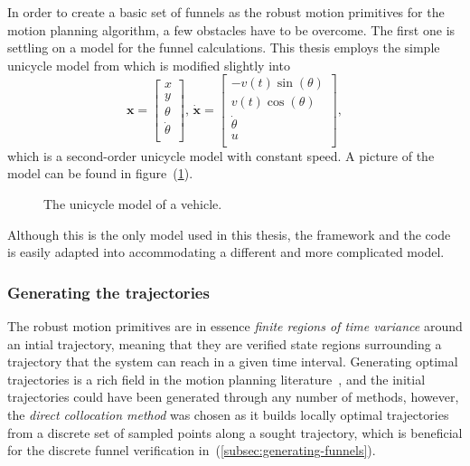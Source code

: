 In order to create a basic set of funnels as the robust motion primitives for
the \rrtfunnel{} motion planning algorithm, a few obstacles have to be overcome.
The first one is settling on a model for the funnel calculations. This thesis
employs the simple unicycle model from \cite[LaValle.p~613]{Lav06} which is
modified slightly into
\begin{equation}
  \label{eq:model-dynamics}
  \mathbf{x} =
  \begin{bmatrix}
    x \\ y \\ \theta \\ \dot{\theta} \\
  \end{bmatrix}, \, \dot{\mathbf{x}} =
  \begin{bmatrix}
    -v(t)\sin(\theta) \\
    v(t)\cos(\theta) \\
    \dot{\theta} \\
    u \\
  \end{bmatrix},
\end{equation}
which is a second-order unicycle model with constant speed. A picture of the
model can be found in figure~(\ref{fig:second-order-unicycle}).
\begin{figure}
  \centering {}
  \caption{The unicycle model of a vehicle.}
  \label{fig:second-order-unicycle}
\end{figure}
Although this is the only model used in this thesis, the framework and the code
is easily adapted into accommodating a different and more complicated model.

\subsubsection{Generating the trajectories}

The robust motion primitives are in essence \textit{finite regions of time
  variance} around an intial trajectory, meaning that they are verified state
regions surrounding a trajectory that the system can reach in a given time
interval. Generating optimal trajectories is a rich field in the motion planning
literature~\cite{bettsSurveyNumericalMethods}, and the initial trajectories
could have been generated through any number of methods, however, the
\textit{direct collocation method} was chosen as it builds locally optimal
trajectories from a discrete set of sampled points along a sought trajectory,
which is beneficial for the discrete funnel verification
in~(\ref{subsec:generating-funnels}).

